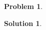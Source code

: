 \documentclass[10pt]{article}
\author{}
\title{}
\date{\today}
\theoremstyle{plain}
\theoremstyle{definition}
\newtheorem{prob}{Problem}
\newtheorem*{sol}{Solution}
\theoremstyle{remark}
\begin{document}
\begin{prob}

\end{prob}

\medskip 

\begin{sol}

\end{sol}

\pagebreak
\end{document}
